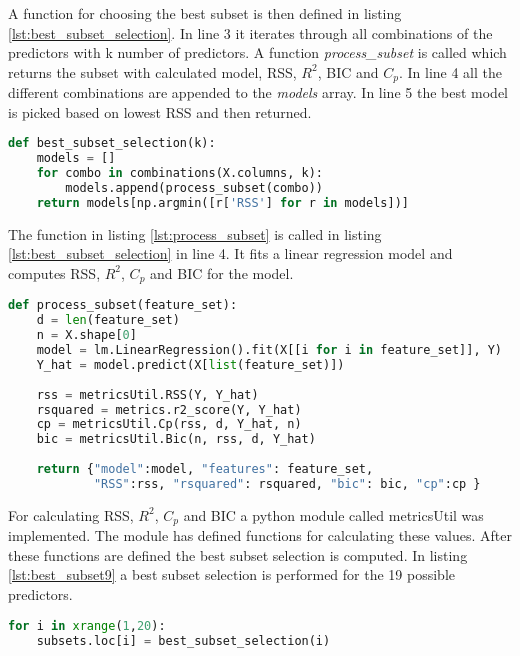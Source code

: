 A function for choosing the best subset is then defined in listing \ref{lst:best_subset_selection}. In line 3 it iterates through all combinations of the predictors with k number of predictors. A function \emph{process\_subset} is called which returns the subset with calculated model, RSS, $R^2$, BIC and $C_p$. In line 4 all the different combinations are appended to the \emph{models} array. In line 5 the best model is picked based on lowest RSS and then returned.

\begin{lstlisting}[language=Python, label=lst:best_subset_selection, caption=Function for choosing best subset]
def best_subset_selection(k):
	models = []
	for combo in combinations(X.columns, k):
		models.append(process_subset(combo))
	return models[np.argmin([r['RSS'] for r in models])]
\end{lstlisting}

The function in listing \ref{lst:process_subset} is called in listing \ref{lst:best_subset_selection} in line 4. It fits a linear regression model and computes RSS, $R^2$, $C_p$ and BIC for the model.

\begin{lstlisting}[language=Python, label=lst:process_subset, caption=Function for computing metrics for subset]
def process_subset(feature_set):
	d = len(feature_set)
	n = X.shape[0]
	model = lm.LinearRegression().fit(X[[i for i in feature_set]], Y)
	Y_hat = model.predict(X[list(feature_set)])
	
	rss = metricsUtil.RSS(Y, Y_hat)  
	rsquared = metrics.r2_score(Y, Y_hat)
	cp = metricsUtil.Cp(rss, d, Y_hat, n)
	bic = metricsUtil.Bic(n, rss, d, Y_hat)
	
	return {"model":model, "features": feature_set,
			"RSS":rss, "rsquared": rsquared, "bic": bic, "cp":cp }
\end{lstlisting}

For calculating RSS, $R^2$, $C_p$ and BIC a python module called metricsUtil was implemented. The module has defined functions for calculating these values. After these functions are defined the best subset selection is computed. In listing \ref{lst:best_subset9} a best subset selection is performed for the 19 possible predictors.

\begin{lstlisting}[language=Python, label=lst:best_subset9, caption=Calculating the best subset from 1 to 19 predictors]
for i in xrange(1,20):
	subsets.loc[i] = best_subset_selection(i)
\end{lstlisting}

